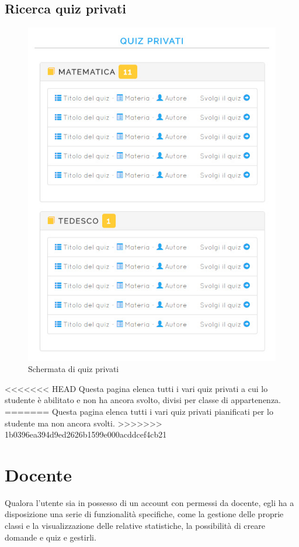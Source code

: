 \documentclass[a4paper, titlepage]{article}
\begin{document}
	 \subsection{Ricerca quiz privati}
	 \begin{figure}[!h]
	 	\centering
	 	\includegraphics[scale=0.33]{Img/screen_ListaQuizPrivati.png}
	 	\caption{Schermata di quiz privati}
	 \end{figure}
<<<<<<< HEAD
	 Questa pagina elenca tutti i vari quiz privati a cui lo studente è abilitato e non ha ancora svolto, divisi per classe di appartenenza.
=======
	 Questa pagina elenca tutti i vari quiz privati pianificati per lo studente ma non ancora svolti.
>>>>>>> 1b0396ea394d9ed2626b1599e000acddcef4cb21
	 
	 
	 \newpage
	 \section{Docente}
	 Qualora l'utente sia in possesso di un account con permessi da docente, egli ha a disposizione una serie di funzionalità specifiche, come la gestione delle proprie classi e la visualizzazione delle relative statistiche, la possibilità di creare domande e quiz e gestirli.
	 
\end{document}
